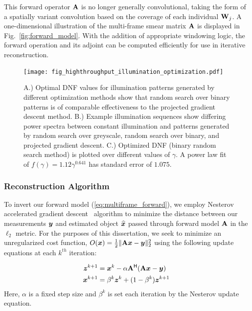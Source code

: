 This forward operator $\mathbf{A}$ is no longer generally convolutional, taking the form of a spatially variant convolution based on the coverage of each individual $\mathbf{W}_j$. A one-dimensional illustration of the multi-frame smear matrix $\mathbf{A}$ is displayed in Fig.~\ref{fig:forward_model}.
With the addition of appropriate windowing logic, the forward operation and its adjoint can be computed efficiently for use in iterative reconstruction.

\begin{figure}
  \centering
    \texttt{[image: fig\_highthroughput\_illumination\_optimization.pdf]}

  \caption{ \label{fig:illum_optimization} A.) Optimal DNF values for illumination patterns generated by different optimization methods show that random search over binary patterns is of comparable effectiveness to the projected gradient descent method. B.) Example illumination sequences show differing power spectra between constant illumination and patterns generated by random search over greyscale, random search over binary, and projected gradient descent. C.) Optimized DNF (binary random search method) is plotted over different values of $\gamma$. A power law fit of $f(\gamma) = 1.12 \gamma^{0.641}$ has standard error of $1.075$.}
\end{figure}

\subsubsection{Reconstruction Algorithm}\label{sec:highthroughput:recon}
To invert our forward model (\eqref{eq:multiframe_forward}), we employ Nesterov accelerated gradient descent~\cite{nesterov} algorithm to minimize the distance between our measurements $\bm{y}$ and estimated object $\widehat {\bm{x}}$ passed through forward model $\mathbf{A}$ in the $\ell_2$ metric. For the purposes of this dissertation, we seek to minimize an unregularized cost function, $O(\bm{x}) = \frac{1}{2}\|\mathbf{A}\bm{x} - \bm{y}\|_2^2$ using the following update equations at each $k^{th}$ iteration:

\begin{align}\label{eq:reconstruction}
\begin{split}
    \bm z^{k+1} &= \bm{x}^k - \alpha \mathbf{A}^{\mathsf{H}} (\mathbf{A}\bm{x} - \bm{y}) \\
    \bm{x}^{k+1} &= \beta^k \bm z^k + (1-\beta^k) \bm z^{k+1}\:
\end{split}
\end{align}
Here, $\alpha$ is a fixed step size and $\beta^k$ is set each iteration by the Nesterov update equation.

